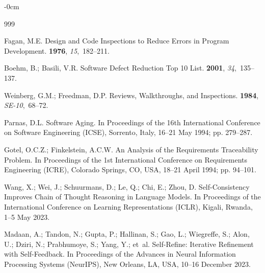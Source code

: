 \documentclass[software,article,accept,pdftex,oneauthor]{Definitions/mdpi}
\def\hl#1{#1}
\begin{document}
\newpage
\begin{adjustwidth}{-\extralength}{0cm}
%
\begin{thebibliography}{999}

Fagan, M.E.
\newblock Design and Code Inspections to Reduce Errors in Program Development.
 {\bf 1976}, {\em 15},~182--211.

Boehm, B.; Basili, V.R.
\newblock Software Defect Reduction Top 10 List.
 {\bf 2001}, {\em 34},~135--137.

Weinberg, G.M.; Freedman, D.P.
\newblock Reviews, Walkthroughs, and Inspections.
 {\bf 1984}, {\em
  SE-10},~68--72.

Parnas, D.L.
\newblock Software Aging.
\newblock In Proceedings of the 16th International
  Conference on Software Engineering (ICSE), Sorrento, Italy,  \hl{16--21 May} %
 1994; pp.
  279--287.

Gotel, O.C.Z.; Finkelstein, A.C.W.
\newblock An Analysis of the Requirements Traceability Problem.
\newblock In Proceedings of the 1st International Conference
  on Requirements Engineering (ICRE), Colorado Springs, CO, USA, \hl{18--21 April} 1994; pp.
  94--101.

Wang, X.; Wei, J.; Schuurmans, D.; Le, Q.; Chi, E.; Zhou, D.
\newblock Self-Consistency Improves Chain of Thought Reasoning in Language
  Models.
\newblock In Proceedings of the International Conference on
  Learning Representations (ICLR), Kigali, Rwanda, \hl{1--5 May} 2023.

Madaan, A.; Tandon, N.; Gupta, P.; Hallinan, S.; Gao, L.; Wiegreffe, S.; Alon,
  U.; Dziri, N.; Prabhumoye, S.; Yang, Y.;  et~al.
\newblock Self-Refine: Iterative Refinement with Self-Feedback.
\newblock In Proceedings of the Advances in Neural Information Processing
  Systems (NeurIPS), New Orleans, LA, USA,  \hl{10--16 December} 2023.


\end{thebibliography}
\end{adjustwidth}
\end{document}
